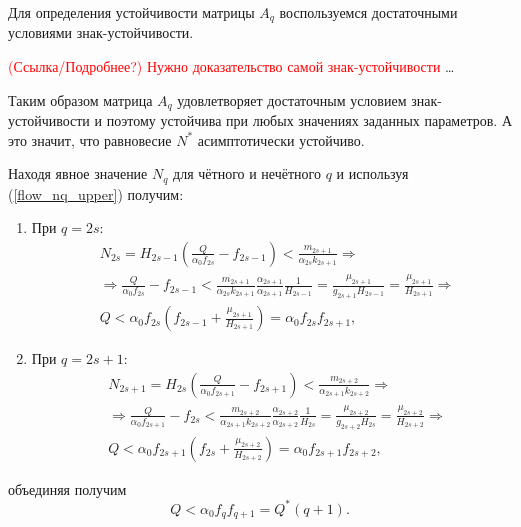         Для определения устойчивости матрицы \(A_q\) воспользуемся достаточными условиями знак-устойчивости. 
        
        \textcolor{red}{(Ссылка/Подробнее?) Нужно доказательство самой знак-устойчивости} \dots

        Таким образом матрица \(A_q\) удовлетворяет достаточным условием знак-устойчивости и поэтому устойчива при любых значениях заданных параметров. А это значит, что равновесие \(N^*\) асимптотически устойчиво.

        Находя явное значение \(N_q\) для чётного и нечётного \(q\) и используя (\ref{flow_nq_upper}) получим:
        \begin{enumerate}
            \item При \(q = 2s\):
            \begin{equation}
                \begin{split}
                    & N_{2s} = H_{2s-1} \left( \frac{Q}{\alpha_0 f_{2s}} - f_{2s-1} \right) < \frac{m_{2s+1}}{\alpha_{2s} k_{2s+1}} \Rightarrow \\
                    & \Rightarrow \frac{Q}{\alpha_0 f_{2s}} - f_{2s-1} < \frac{m_{2s+1}}{\alpha_{2s} k_{2s+1}} \frac{\alpha_{2s+1}}{\alpha_{2s+1}} \frac{1}{H_{2s-1}} = \frac{\mu_{2s+1}}{g_{2s+1} H_{2s-1}} = \frac{\mu_{2s+1}}{H_{2s+1}} \Rightarrow \\
                    & Q < \alpha_0 f_{2s} \left(  f_{2s-1} + \frac{\mu_{2s+1}}{H_{2s+1}} \right) = \alpha_0 f_{2s} f_{2s+1},        
                \end{split}
            \end{equation}
            
            \item При \(q = 2s+1\):
            \begin{equation}
                \begin{split}
                    & N_{2s+1} = H_{2s} \left( \frac{Q}{\alpha_0 f_{2s+1}} - f_{2s+1} \right) < \frac{m_{2s+2}}{\alpha_{2s+1} k_{2s+2}} \Rightarrow \\
                    & \Rightarrow \frac{Q}{\alpha_0 f_{2s+1}} - f_{2s} < \frac{m_{2s+2}}{\alpha_{2s+1} k_{2s+2}} \frac{\alpha_{2s+2}}{\alpha_{2s+2}} \frac{1}{H_{2s}} = \frac{\mu_{2s+2}}{g_{2s+2} H_{2s}} = \frac{\mu_{2s+2}}{H_{2s+2}} \Rightarrow \\
                    & Q < \alpha_0 f_{2s+1} \left(  f_{2s} + \frac{\mu_{2s+2}}{H_{2s+2}} \right) = \alpha_0 f_{2s+1} f_{2s+2},      
                \end{split}
            \end{equation}
        \end{enumerate}
        объединяя получим
        \begin{equation}
            Q < \alpha_0 f_{q} f_{q+1} = Q^*(q+1).
        \end{equation}

